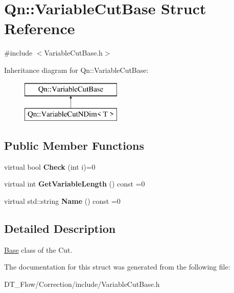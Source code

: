 \hypertarget{structQn_1_1VariableCutBase}{}\section{Qn\+:\+:Variable\+Cut\+Base Struct Reference}
\label{structQn_1_1VariableCutBase}


{\ttfamily \#include $<$Variable\+Cut\+Base.\+h$>$}

Inheritance diagram for Qn\+:\+:Variable\+Cut\+Base\+:\begin{figure}[H]
\begin{center}
\leavevmode
\includegraphics[height=2.000000cm]{structQn_1_1VariableCutBase}
\end{center}
\end{figure}
\subsection*{Public Member Functions}
\begin{DoxyCompactItemize}
\item 
\mbox{\label{structQn_1_1VariableCutBase_a83b516324dd83cf549984e9511ea5ce8}} 
virtual bool {\bfseries Check} (int i)=0
\item 
\mbox{\label{structQn_1_1VariableCutBase_acc1b2a4f80308104725c6b02f28d3c8b}} 
virtual int {\bfseries Get\+Variable\+Length} () const =0
\item 
\mbox{\label{structQn_1_1VariableCutBase_a8b5e0e30d413b0d7731a4b6ac8f4ca91}} 
virtual std\+::string {\bfseries Name} () const =0
\end{DoxyCompactItemize}


\subsection{Detailed Description}
\mbox{\hyperlink{classBase}{Base}} class of the Cut. 

The documentation for this struct was generated from the following file\+:\begin{DoxyCompactItemize}
\item 
D\+T\+\_\+\+Flow/\+Correction/include/Variable\+Cut\+Base.\+h\end{DoxyCompactItemize}
